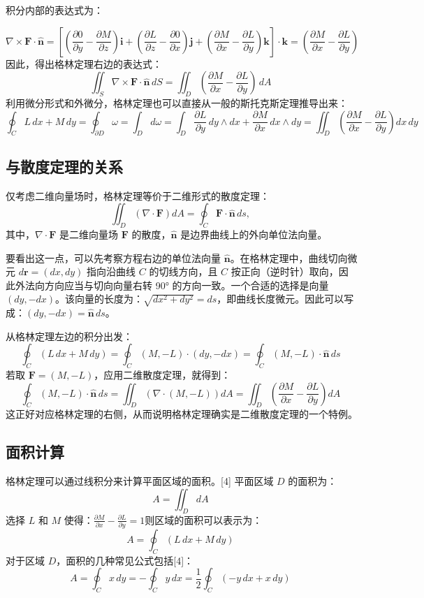 积分内部的表达式为：

$$
\nabla \times \mathbf{F} \cdot \mathbf{\hat{n}}
= 
\left[
\left(\frac{\partial 0}{\partial y} - \frac{\partial M}{\partial z}\right)\mathbf{i}
+ \left(\frac{\partial L}{\partial z} - \frac{\partial 0}{\partial x}\right)\mathbf{j}
+ \left(\frac{\partial M}{\partial x} - \frac{\partial L}{\partial y}\right)\mathbf{k}
\right]
\cdot \mathbf{k}
= 
\left(\frac{\partial M}{\partial x} - \frac{\partial L}{\partial y}\right)~
$$
因此，得出格林定理右边的表达式：
$$
\iint_S \nabla \times \mathbf{F} \cdot \mathbf{\hat{n}} \, dS
= 
\iint_D 
\left(\frac{\partial M}{\partial x} - \frac{\partial L}{\partial y}\right) 
\, dA~
$$
利用微分形式和外微分，格林定理也可以直接从一般的斯托克斯定理推导出来：
$$
\oint_C L\,dx + M\,dy
= \oint_{\partial D} \omega
= \int_D d\omega
= \int_D 
\frac{\partial L}{\partial y} \, dy \wedge dx
+ \frac{\partial M}{\partial x} \, dx \wedge dy
= 
\iint_D 
\left(\frac{\partial M}{\partial x} - \frac{\partial L}{\partial y}\right)
dx\,dy~
$$
\subsection{与散度定理的关系}
仅考虑二维向量场时，格林定理等价于二维形式的散度定理：
$$
\iint_D \left(\nabla \cdot \mathbf{F} \right) dA
= 
\oint_C \mathbf{F} \cdot \mathbf{\hat{n}} \, ds,~
$$
其中，$\nabla \cdot \mathbf{F}$ 是二维向量场 $\mathbf{F}$ 的散度，$\mathbf{\hat{n}}$ 是边界曲线上的外向单位法向量。

要看出这一点，可以先考察方程右边的单位法向量 $\mathbf{\hat{n}}$。在格林定理中，曲线切向微元 $d\mathbf{r} = (dx, dy)$ 指向沿曲线 $C$ 的切线方向，且 $C$ 按正向（逆时针）取向，因此外法向方向应当与切向向量右转 90° 的方向一致。一个合适的选择是向量 $(dy, -dx)$。该向量的长度为：$\sqrt{dx^2 + dy^2} = ds$，即曲线长度微元。因此可以写成：$(dy, -dx) = \mathbf{\hat{n}} \, ds$。

从格林定理左边的积分出发：
$$
\oint_C (L\,dx + M\,dy)
=
\oint_C (M, -L) \cdot (dy, -dx)
=
\oint_C (M, -L) \cdot \mathbf{\hat{n}} \, ds~
$$
若取 $\mathbf{F} = (M, -L)$，应用二维散度定理，就得到：
$$
\oint_C (M, -L) \cdot \mathbf{\hat{n}} \, ds
=
\iint_D \left(\nabla \cdot (M, -L)\right) dA
=
\iint_D 
\left(
\frac{\partial M}{\partial x}
-
\frac{\partial L}{\partial y}
\right)
dA~
$$
这正好对应格林定理的右侧，从而说明格林定理确实是二维散度定理的一个特例。
\subsection{面积计算}
格林定理可以通过线积分来计算平面区域的面积。[4] 平面区域 $D$ 的面积为：
$$
A = \iint_D dA~
$$
选择 $L$ 和 $M$ 使得：$\frac{\partial M}{\partial x} - \frac{\partial L}{\partial y} = 1$则区域的面积可以表示为：
$$
A = \oint_C (L\,dx + M\,dy)~
$$
对于区域 $D$，面积的几种常见公式包括[4]：
$$
A = \oint_C x\,dy
= -\oint_C y\,dx
= \frac{1}{2} \oint_C (-y\,dx + x\,dy)~
$$
